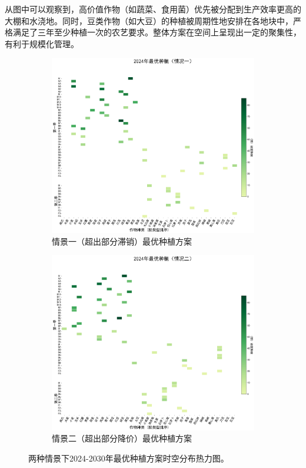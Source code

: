 从图中可以观察到，高价值作物（如蔬菜、食用菌）优先被分配到生产效率更高的大棚和水浇地。同时，豆类作物（如大豆）的种植被周期性地安排在各地块中，严格满足了三年至少种植一次的农艺要求。整体方案在空间上呈现出一定的聚集性，有利于规模化管理。

\begin{figure}[H]
    \centering
    \begin{subfigure}[b]{0.45\textwidth}
        \centering
        \includegraphics[width=\textwidth]{figs/3问题一/2024年最优种植方案（情况一）.png}
        \caption{情景一（超出部分滞销）最优种植方案}
        \label{fig:heatmap_case1}
    \end{subfigure}
    \begin{subfigure}[b]{0.45\textwidth}
        \centering
        \includegraphics[width=\textwidth]{figs/3问题一/2024年最优种植方案（情况二）.png}

        \caption{情景二（超出部分降价）最优种植方案}
        \label{fig:heatmap_case2}
    \end{subfigure}
    \caption{两种情景下2024-2030年最优种植方案时空分布热力图。}
    \label{fig:heatmap}
\end{figure}



